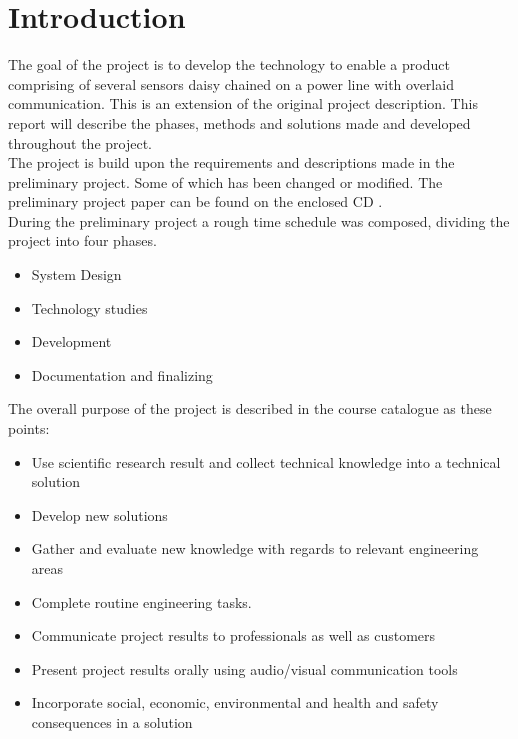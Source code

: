 \chapter{Introduction}

The goal of the project is to develop the technology to enable a product comprising of several sensors daisy chained on a power line with overlaid communication. This is an extension of the original project description. This report will describe the phases, methods and solutions made and developed throughout the project.\\

The project is build upon the requirements and descriptions made in the preliminary project. Some of which has been changed or modified. The preliminary project paper can be found on the enclosed CD \cite{cd}.\\

During the preliminary project a rough time schedule was composed, dividing the project into four phases.

\begin{itemize}
	\item System Design
	\item Technology studies
	\item Development
	\item Documentation and finalizing
\end{itemize}

The overall purpose of the project is described in the course catalogue as these points:

\begin{itemize}
	\item Use scientific research result and collect technical knowledge into a technical solution
	\item Develop new solutions
	\item Gather and evaluate new knowledge with regards to relevant engineering areas
	\item Complete routine engineering tasks.
	\item Communicate project results to professionals as well as customers
	\item Present project results orally using audio/visual communication tools
	\item Incorporate social, economic, environmental and health and safety consequences in a solution	
\end{itemize}

